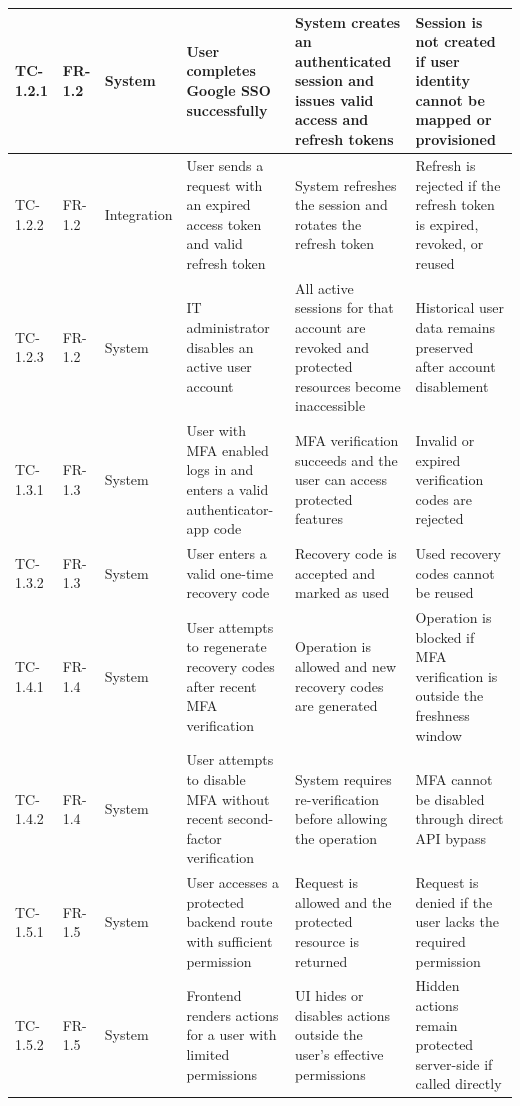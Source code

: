 \begin{longtable}{|>{\centering\arraybackslash}m{}|>{\centering\arraybackslash}m{}|>{\centering\arraybackslash}m{}|m{}|m{}|m{}|}
TC-1.2.1 & FR-1.2 & System & User completes Google SSO successfully & System creates an authenticated session and issues valid access and refresh tokens & Session is not created if user identity cannot be mapped or provisioned \\ \hline
TC-1.2.2 & FR-1.2 & Integration & User sends a request with an expired access token and valid refresh token & System refreshes the session and rotates the refresh token & Refresh is rejected if the refresh token is expired, revoked, or reused \\ \hline
TC-1.2.3 & FR-1.2 & System & IT administrator disables an active user account & All active sessions for that account are revoked and protected resources become inaccessible & Historical user data remains preserved after account disablement \\ \hline

TC-1.3.1 & FR-1.3 & System & User with MFA enabled logs in and enters a valid authenticator-app code & MFA verification succeeds and the user can access protected features & Invalid or expired verification codes are rejected \\ \hline
TC-1.3.2 & FR-1.3 & System & User enters a valid one-time recovery code & Recovery code is accepted and marked as used & Used recovery codes cannot be reused \\ \hline

TC-1.4.1 & FR-1.4 & System & User attempts to regenerate recovery codes after recent MFA verification & Operation is allowed and new recovery codes are generated & Operation is blocked if MFA verification is outside the freshness window \\ \hline
TC-1.4.2 & FR-1.4 & System & User attempts to disable MFA without recent second-factor verification & System requires re-verification before allowing the operation & MFA cannot be disabled through direct API bypass \\ \hline

TC-1.5.1 & FR-1.5 & System & User accesses a protected backend route with sufficient permission & Request is allowed and the protected resource is returned & Request is denied if the user lacks the required permission \\ \hline
TC-1.5.2 & FR-1.5 & System & Frontend renders actions for a user with limited permissions & UI hides or disables actions outside the user's effective permissions & Hidden actions remain protected server-side if called directly \\ \hline


\end{longtable}
